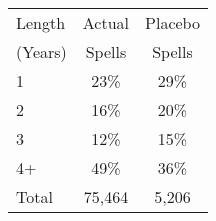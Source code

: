 \begin{tabular}{lcc}
\toprule
Length & Actual & Placebo \\
(Years) & Spells & Spells \\
\midrule
1 & 23\% & 29\% \\
2 & 16\% & 20\% \\
3 & 12\% & 15\% \\
4+ & 49\% & 36\% \\
Total &       75,464 &        5,206 \\
\bottomrule
\end{tabular}
